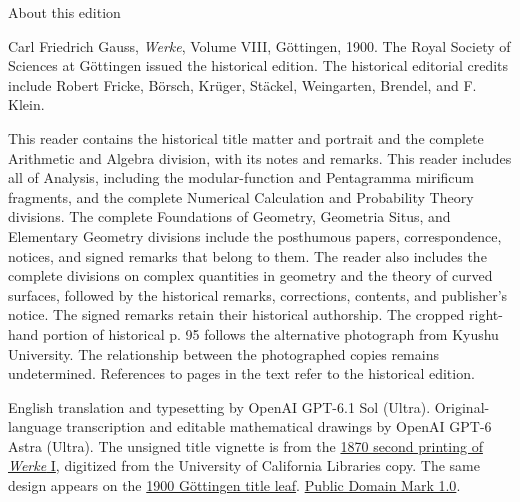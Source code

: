\begin{center}\large About this edition\end{center}
\noindent Carl Friedrich Gauss, \emph{Werke}, Volume VIII, Göttingen, 1900.
The Royal Society of Sciences at Göttingen issued the historical edition.
The historical editorial credits include Robert Fricke, Börsch, Krüger, Stäckel, Weingarten, Brendel, and F. Klein.

\noindent This reader contains the historical title matter and portrait and the complete
Arithmetic and Algebra division, with its notes and remarks. This reader includes all of Analysis, including the modular-function and Pentagramma mirificum fragments, and the complete Numerical Calculation and Probability Theory divisions. The complete Foundations of Geometry, Geometria Situs, and Elementary Geometry divisions include the posthumous papers, correspondence, notices, and signed remarks that belong to them. The reader also includes the complete divisions on complex quantities in geometry and the theory of curved surfaces, followed by the historical remarks, corrections, contents, and publisher’s notice. The signed remarks retain their historical authorship. The cropped right-hand portion of historical p. 95 follows the alternative photograph from Kyushu University. The relationship between the photographed copies remains undetermined. References to pages
in the text refer to the historical edition.

\noindent English translation and typesetting by OpenAI GPT-6.1 Sol (Ultra).
Original-language transcription and editable mathematical drawings by OpenAI GPT-6 Astra (Ultra).
The unsigned title vignette is from the \href{https://commons.wikimedia.org/w/index.php?oldid=1179960952}{1870 second printing of \textit{Werke} I}, digitized from the University of California Libraries copy. The same design appears on the \href{https://gdz.sub.uni-goettingen.de/id/PPN236010751}{1900 Göttingen title leaf}. \href{https://creativecommons.org/publicdomain/mark/1.0/}{Public Domain Mark 1.0}.
\clearpage
